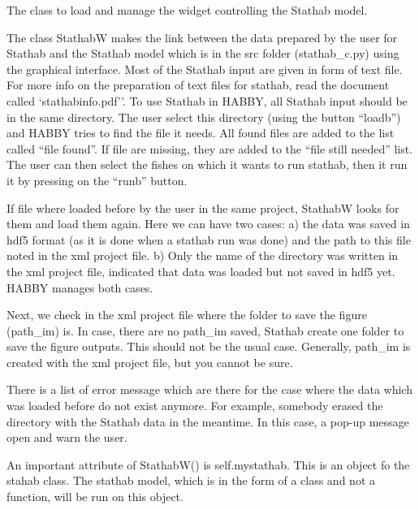 \documentclass[letterpaper,10pt,english]{sphinxmanual}
\begin{document}
\begin{fulllineitems}
\label{\detokenize{index:src_GUI.stathab_GUI.StathabW}}
The class to load and manage the widget controlling the Stathab model.


The class StathabW makes the link between the data prepared by the user for Stathab and  the Stathab model
which is in the src folder (stathab\_c.py) using the graphical interface.  Most of the Stathab input are given in
form of text file. For more info on the preparation of text files for stathab, read the document called
`stathabinfo.pdf''.  To use Stathab in HABBY, all Stathab input should be in the same directory. The user select
this directory (using the button “loadb”) and HABBY tries to find the file it needs. All found files are added to
the list called “file found”. If file are missing, they are added to the “file still needed” list.  The user can then
select the fishes on which it wants to run stathab, then it run it by pressing on the “runb” button.

If file where loaded before by the user in the same project, StathabW looks for them and load them again. Here we
can have two cases: a) the data was saved in hdf5 format (as it is done when a stathab run was done) and the path
to this file noted in the xml project file. b) Only the name of the directory was written in the xml project file,
indicated that data was loaded but not saved in hdf5 yet. HABBY manages both cases.

Next, we check in the xml project file where the folder to save the figure (path\_im) is. In case, there are
no path\_im saved, Stathab create one folder to save the figure outputs. This should not be the usual case. Generally,
path\_im is created with the xml project file, but you cannot be sure.

There is a list of error message which are there for the case where the data which was loaded before do not exist
anymore. For example, somebody erased the directory with the Stathab data in the meantime.  In this case,
a pop-up message open and warn the user.

An important attribute of StathabW() is self.mystathab. This is an object fo the stahab class. The stathab model,
which is in the form of a class and not a function, will be run on this object.


\end{fulllineitems}
\end{document}
